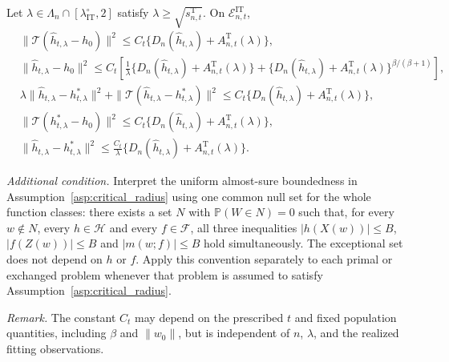 \begin{lemma}\label{lemma:iter_trae_accepted_stability}
Let $\lambda\in\Lambda_n\cap[\lambda_{\mathrm{IT}}^\circ,2]$ satisfy
$\lambda\geqslant\sqrt{s_{n,t}^{\mathrm T}}$. On
$\mathcal E_{n,t}^{\mathrm{IT}}$,
\begin{align}
&\|\mathcal T(\hat h_{t,\lambda}-h_0)\|^2
\leqslant C_t \{D_n(\hat h_{t,\lambda})+A_{n,t}^{\mathrm T}(\lambda)\},
\label{eq:iter_trae_accepted_total}\\
&\|\hat h_{t,\lambda}-h_0\|^2
\leqslant C_t\left[
\frac{1}{\lambda}\{D_n(\hat h_{t,\lambda})+A_{n,t}^{\mathrm T}(\lambda)\}
+\{D_n(\hat h_{t,\lambda})+A_{n,t}^{\mathrm T}(\lambda)\}^{\beta/(\beta+1)}
\right],
\label{eq:iter_trae_accepted_total_strong}\\
&\lambda\|\hat h_{t,\lambda}-h_{t,\lambda}^*\|^2
+\|\mathcal T(\hat h_{t,\lambda}-h_{t,\lambda}^*)\|^2
\leqslant C_t \{D_n(\hat h_{t,\lambda})+A_{n,t}^{\mathrm T}(\lambda)\},
\label{eq:iter_trae_accepted_variance}\\
&\|\mathcal T(h_{t,\lambda}^*-h_0)\|^2
\leqslant C_t \{D_n(\hat h_{t,\lambda})+A_{n,t}^{\mathrm T}(\lambda)\},
\label{eq:iter_trae_accepted_bias}\\
&\|\hat h_{t,\lambda}-h_{t,\lambda}^*\|^2
\leqslant \frac{C_t}{\lambda} \{D_n(\hat h_{t,\lambda})+A_{n,t}^{\mathrm T}(\lambda)\}.
\label{eq:iter_trae_accepted_strong}
\end{align}

\emph{Additional condition.} Interpret the uniform almost-sure boundedness in Assumption~\ref{asp:critical_radius} using one common null set for the whole function classes: there exists a set $N$ with $\mathbb P(W\in N)=0$ such that, for every $w\notin N$, every $h\in\mathcal H$ and every $f\in\mathcal F$, all three inequalities $|h(X(w))|\leqslant B$, $|f(Z(w))|\leqslant B$ and $|m(w;f)|\leqslant B$ hold simultaneously. The exceptional set does not depend on $h$ or $f$. Apply this convention separately to each primal or exchanged problem whenever that problem is assumed to satisfy Assumption~\ref{asp:critical_radius}.
\end{lemma}

\noindent\textit{Remark.} The constant $C_t$ may depend on the prescribed $t$ and fixed population quantities, including $\beta$ and $\|w_0\|$, but is independent of $n$, $\lambda$, and the realized fitting observations.

